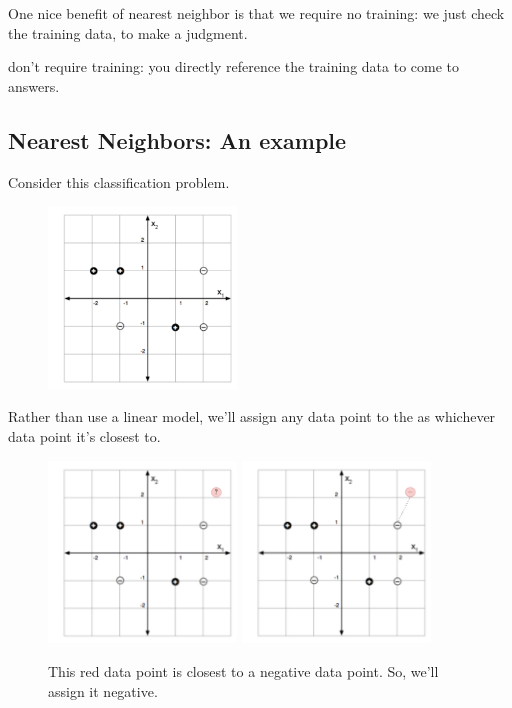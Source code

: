     One nice benefit of nearest neighbor is that we require no training: we just check the training data, to make a judgment.\\
    
    \begin{concept}
         don't require training: you directly reference the training data to come to answers.
    \end{concept}

    \phantom{}

    \subsection{Nearest Neighbors: An example}

        Consider this classification problem. 
    
        \begin{figure}[H]
            \centering
            \includegraphics[width=50mm,scale=0.5]{images/nonparametric_images/classification_example.png}
        \end{figure}
        
        Rather than use a linear model, we'll assign any data point to the  as whichever data point it's closest to.
    
        \begin{figure}[H]
            \centering
            \includegraphics[width=50mm,scale=0.5]{images/nonparametric_images/mystery_datapoint.png}
            \includegraphics[width=50mm,scale=0.5]{images/nonparametric_images/mystery_assigned.png}
            \caption*{This red data point is closest to a negative data point. So, we'll assign it negative.}
        \end{figure}
    
